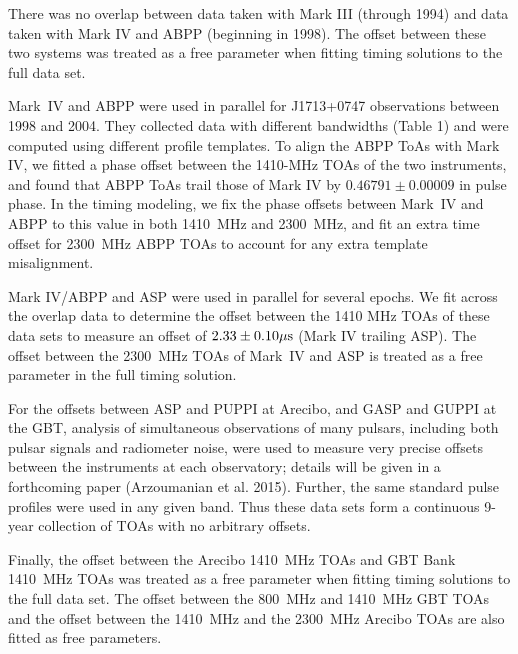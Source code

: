 There was no overlap between data taken with Mark III (through 1994) and
data taken with Mark IV and ABPP (beginning in 1998).  The offset between
these two systems was treated as a free parameter when fitting timing
solutions to the full data set.

Mark~IV and ABPP were used in parallel for J1713+0747 observations between
1998 and 2004. They collected data with different bandwidths (Table 1) and
were computed using different profile templates. To align the ABPP ToAs
with Mark IV, we fitted a phase offset between the 1410-MHz TOAs of the
two instruments, and found that ABPP ToAs trail those of Mark IV
by $0.46791\pm0.00009$ in pulse phase. In the timing modeling, we fix
the phase offsets between Mark~IV and ABPP to this value in
both 1410~MHz and 2300~MHz, and fit an extra time offset for 2300~MHz ABPP 
TOAs to account for any extra template misalignment.


Mark IV/ABPP and ASP were used in parallel for several epochs.  We fit
across the overlap data to determine the offset between the 1410 MHz
TOAs of these data sets to measure an offset of $2.33\pm0.10\mu{\rm s}$
(Mark IV trailing ASP). The offset between the 2300~MHz TOAs of Mark~IV 
and ASP is treated as a free parameter in the full timing solution.

For the offsets between ASP and PUPPI at Arecibo, and GASP and GUPPI
at the GBT, analysis of simultaneous observations of many pulsars,
including both pulsar signals and radiometer noise, were used to
measure very precise offsets between the instruments at each
observatory; details will be given in a forthcoming paper (Arzoumanian
et al. 2015).  Further, the same standard pulse profiles were used in
any given band.  Thus these data sets form a continuous 9-year
collection of TOAs with no arbitrary offsets.

Finally, the offset between the Arecibo 1410~MHz TOAs and GBT Bank 1410~MHz TOAs 
 was treated as a free parameter when fitting timing solutions to the full data set.  
The offset between the 800~MHz and 1410~MHz GBT TOAs and the offset between
the 1410~MHz and the 2300~MHz Arecibo TOAs are also fitted as free
parameters.  


